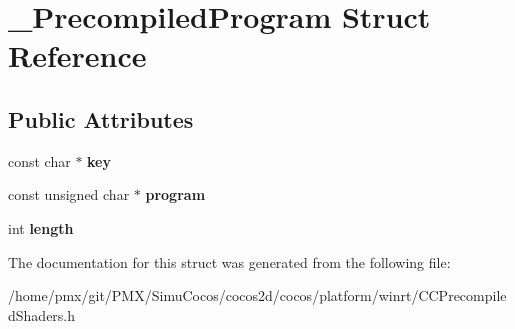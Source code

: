 \hypertarget{struct__PrecompiledProgram}{}\section{\+\_\+\+Precompiled\+Program Struct Reference}
\label{struct__PrecompiledProgram}
\subsection*{Public Attributes}
\begin{DoxyCompactItemize}
\item 
\mbox{\label{struct__PrecompiledProgram_af35818720316a570950fdba03e6a43bf}} 
const char $\ast$ {\bfseries key}
\item 
\mbox{\label{struct__PrecompiledProgram_a83ce08a8215016140ce2fab3704cfd62}} 
const unsigned char $\ast$ {\bfseries program}
\item 
\mbox{\label{struct__PrecompiledProgram_a13cefa919b8eb9c618e2a2587cfa1f61}} 
int {\bfseries length}
\end{DoxyCompactItemize}


The documentation for this struct was generated from the following file\+:\begin{DoxyCompactItemize}
\item 
/home/pmx/git/\+P\+M\+X/\+Simu\+Cocos/cocos2d/cocos/platform/winrt/C\+C\+Precompiled\+Shaders.\+h\end{DoxyCompactItemize}
